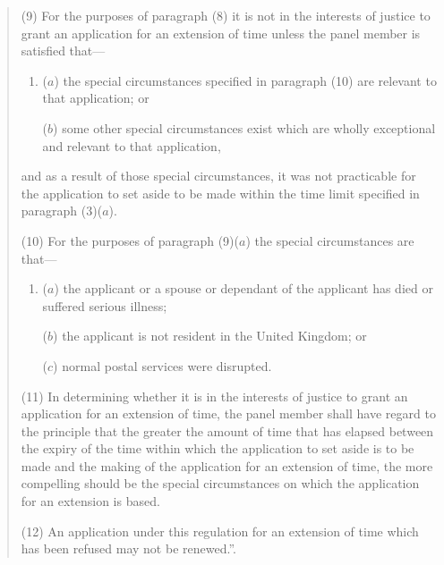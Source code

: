 \documentclass[12pt,a4paper]{article}
\begin{document}
\begin{enumerate}
\begin{quotation}
(9) For the purposes of paragraph (8) it is not in the interests of justice to grant an application for an extension of time unless the panel member is satisfied that—
\begin{enumerate}\item[]
($a$) the special circumstances specified in paragraph (10) are relevant to that application; or

($b$) some other special circumstances exist which are wholly exceptional and relevant to that application,
\end{enumerate}
and as a result of those special circumstances, it was not practicable for the application to set aside to be made within the time limit specified in paragraph (3)($a$).

(10) For the purposes of paragraph (9)($a$)  the special circumstances are that—
\begin{enumerate}\item[]
($a$) the applicant or a spouse or dependant of the applicant has died or suffered serious illness;

($b$) the applicant is not resident in the United Kingdom; or

($c$) normal postal services were disrupted.
\end{enumerate}

(11) In determining whether it is in the interests of justice to grant an application for an extension of time, the panel member shall have regard to the principle that the greater the amount of time that has elapsed between the expiry of the time within which the application to set aside is to be made and the making of the application for an extension of time, the more compelling should be the special circumstances on which the application for an extension is based.

(12) An application under this regulation for an extension of time which has been refused may not be renewed.”.
\end{quotation}
\end{enumerate}

\medskip
\end{document}
